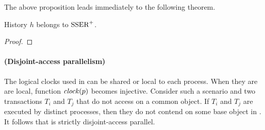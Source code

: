 The above proposition leads immediately to the following theorem.

\begin{theorem}
  History $h$ belongs to $\SPSER$.
\end{theorem}

\begin{proof}
  
  
\end{proof}

\paragraph{(Disjoint-access parallelism)}
The logical clocks used in  can be shared or local to each process.
When they are are local, function $\clockOf{p}$ becomes injective.
Consider such a scenario and two transactions $T_i$ and $T_j$ that do not access on a common object.
If $T_i$ and $T_j$ are executed by distinct processes, then they do not contend on some base object in .
It follows that  is strictly disjoint-access parallel.


